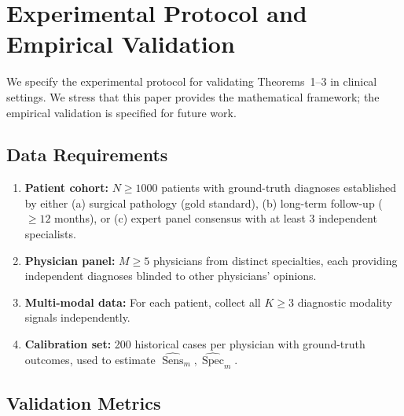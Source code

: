 \documentclass[11pt,a4paper]{article}
\theoremstyle{definition}
\DeclareMathOperator{\Sens}{Sens}
\DeclareMathOperator{\Spec}{Spec}
\begin{document}
\section{Experimental Protocol and Empirical Validation}
\label{sec:experiments}

We specify the experimental protocol for validating Theorems~1--3 in
clinical settings. We stress that this paper provides the mathematical
framework; the empirical validation is specified for future work.

\subsection{Data Requirements}

\begin{enumerate}[label=(\roman*)]
    \item \textbf{Patient cohort:} $N \ge 1000$ patients with ground-truth
    diagnoses established by either (a) surgical pathology (gold standard),
    (b) long-term follow-up ($\ge 12$ months), or (c) expert panel consensus
    with at least 3 independent specialists.
    \item \textbf{Physician panel:} $M \ge 5$ physicians from distinct
    specialties, each providing independent diagnoses blinded to other
    physicians' opinions.
    \item \textbf{Multi-modal data:} For each patient, collect all $K \ge 3$
    diagnostic modality signals independently.
    \item \textbf{Calibration set:} 200 historical cases per physician with
    ground-truth outcomes, used to estimate $\hat{\Sens}_m, \hat{\Spec}_m$.
\end{enumerate}

\subsection{Validation Metrics}
\end{document}
